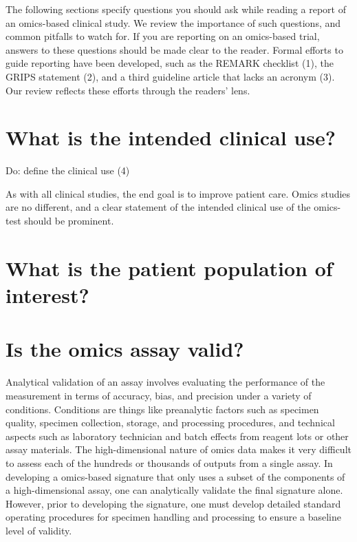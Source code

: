 \documentclass[11pt]{article}
\begin{document}
The following sections specify questions you should ask while reading a
report of an omics-based clinical study. We review the importance of
such questions, and common pitfalls to watch for. If you are reporting
on an omics-based trial, answers to these questions should be made clear
to the reader. Formal efforts to guide reporting have been developed,
such as the REMARK checklist (1), the GRIPS statement (2), and a third
guideline article that lacks an acronym (3). Our review reflects these
efforts through the readers' lens.

\section{What is the intended clinical
use?}\label{what-is-the-intended-clinical-use}

Do: define the clinical use (4)

As with all clinical studies, the end goal is to improve patient care.
Omics studies are no different, and a clear statement of the intended
clinical use of the omics-test should be prominent.

\section{What is the patient population of
interest?}\label{what-is-the-patient-population-of-interest}

\section{Is the omics assay valid?}\label{is-the-omics-assay-valid}

Analytical validation of an assay involves evaluating the performance of
the measurement in terms of accuracy, bias, and precision under a
variety of conditions. Conditions are things like preanalytic factors
such as specimen quality, specimen collection, storage, and processing
procedures, and technical aspects such as laboratory technician and
batch effects from reagent lots or other assay materials. The
high-dimensional nature of omics data makes it very difficult to assess
each of the hundreds or thousands of outputs from a single assay. In
developing a omics-based signature that only uses a subset of the
components of a high-dimensional assay, one can analytically validate
the final signature alone. However, prior to developing the signature,
one must develop detailed standard operating procedures for specimen
handling and processing to ensure a baseline level of validity.
\end{document}

